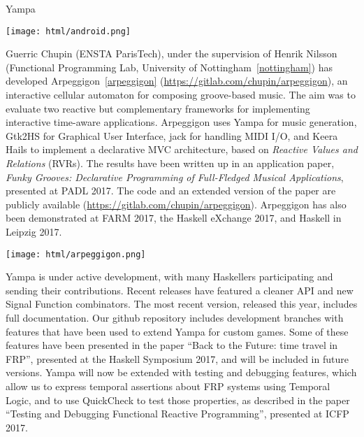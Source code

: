 \begin{hcarentry}[updated]{Yampa}
\begin{center}
\texttt{[image: html/android.png]}
\end{center}

Guerric Chupin (ENSTA ParisTech), under the supervision of Henrik Nilsson
(Functional Programming Lab, University of Nottingham~\cref{nottingham}) has
developed Arpeggigon~\cref{arpeggigon}
(\href{https://gitlab.com/chupin/arpeggigon}{https://gitlab.com/chupin/arpeggigon}),
an interactive cellular automaton for composing groove-based music. The aim
was to evaluate two reactive but complementary frameworks for implementing
interactive time-aware applications. Arpeggigon uses Yampa for music
generation, Gtk2HS for Graphical User Interface, jack for handling MIDI I/O,
and Keera Hails to implement a declarative MVC architecture, based on
\emph{Reactive Values and Relations} (RVRs). The results have been written up
in an application paper, \emph{Funky Grooves: Declarative Programming of
Full-Fledged Musical Applications}, presented at PADL 2017. The code and an
extended version of the paper are publicly available
(\href{https://gitlab.com/chupin/arpeggigon}{https://gitlab.com/chupin/arpeggigon}).
Arpeggigon has also been demonstrated at FARM 2017, the Haskell eXchange 2017,
and Haskell in Leipzig 2017. 

\begin{center}
  \texttt{[image: html/arpeggigon.png]}
\end{center}

Yampa is under active development, with many Haskellers participating and
sending their contributions. Recent releases have featured a cleaner API and
new Signal Function combinators. The most recent version, released this year,
includes full documentation. Our github repository includes development
branches with features that have been used to extend Yampa for custom games.
Some of these features have been presented in the paper ``Back to the Future:
time travel in FRP'', presented at the Haskell Symposium 2017, and will be
included in future versions. Yampa will now be extended with testing and
debugging features, which allow us to express temporal assertions about FRP
systems using Temporal Logic, and to use QuickCheck to test those properties,
as described in the paper ``Testing and Debugging Functional Reactive
Programming'', presented at ICFP 2017. 


\end{hcarentry}
